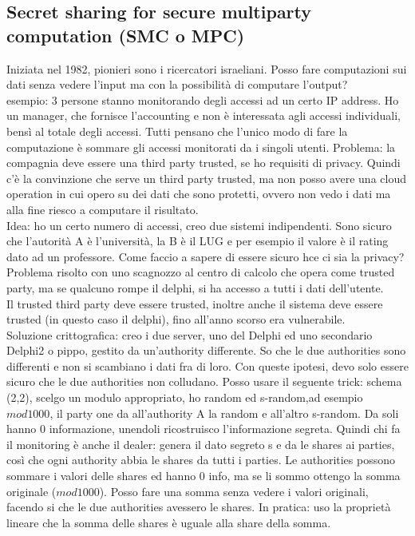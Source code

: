\documentclass[16px]{article}
\begin{document}
\subsection{Secret sharing for secure multiparty computation (SMC o MPC)}
Iniziata nel 1982, pionieri sono i ricercatori israeliani. Posso fare computazioni sui dati senza vedere l'input ma con la possibilità di computare l'output?\\ esempio: 3 persone stanno monitorando degli accessi ad un certo IP address. Ho un manager, che fornisce l'accounting e non è interessata agli accessi individuali, bensì al totale degli accessi. Tutti pensano che l'unico modo di fare la computazione è sommare gli accessi monitorati da i singoli utenti. Problema: la compagnia deve essere una third party trusted, se ho requisiti di privacy. Quindi c'è la convinzione che serve un third party trusted, ma non posso avere una cloud operation in cui opero su dei dati che sono protetti, ovvero non vedo i dati ma alla fine riesco a computare il risultato.\\ Idea: ho un certo numero di accessi, creo due sistemi indipendenti. Sono sicuro che l'autorità A è l'università, la B è il LUG e per esempio il valore è il rating dato ad un professore. Come faccio a sapere di essere sicuro hce ci sia la privacy? Problema risolto con uno scagnozzo al centro di calcolo che opera come trusted party, ma se qualcuno rompe il delphi, si ha accesso a tutti i dati dell'utente.\\ Il trusted third party deve essere trusted, inoltre anche il sistema deve essere trusted (in questo caso il delphi), fino all'anno scorso era vulnerabile.\\ Soluzione crittografica: creo i due server, uno del Delphi ed uno secondario Delphi2 o pippo, gestito da un'authority differente. So che le due authorities sono differenti e non si scambiano i dati fra di loro. Con queste ipotesi, devo solo essere sicuro che le due authorities non colludano. Posso usare il seguente trick: schema (2,2), scelgo un modulo appropriato, ho random ed s-random,ad esempio $mod1000$, il party one da all'authority A la random e all'altro s-random. Da soli hanno 0 informazione, unendoli ricostruisco l'informazione segreta. Quindi chi fa il monitoring è anche il dealer: genera il dato segreto s e da le shares ai parties, così che ogni authority abbia le shares da tutti i parties. Le authorities possono sommare i valori delle shares ed hanno 0 info, ma se li sommo ottengo la somma originale ($mod1000$). Posso fare una somma senza vedere i valori originali, facendo si che le due authorities avessero le shares. In pratica: uso la proprietà lineare che la somma delle shares è uguale alla share della somma.
\end{document}
